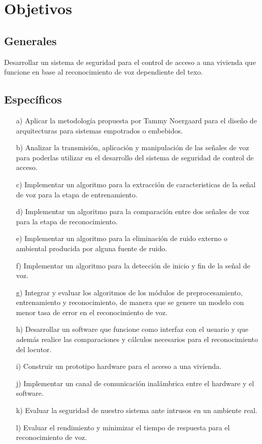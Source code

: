 \section{Objetivos}
\subsection{Generales}
Desarrollar un sistema de seguridad para el control de acceso a una vivienda que funcione en base al reconocimiento de voz dependiente del texo.
\subsection{Específicos}
\begin{enumerate}
\item[a)]Aplicar la metodología propuesta por Tammy Noergaard para el diseño de arquitecturas para sistemas empotrados o embebidos.
\item[b)]Analizar la transmisión, aplicación y manipulación de las señales de voz para poderlas utilizar en el desarrollo del sistema de seguridad de control de acceso.
\item[c)]Implementar un algoritmo para la extracción de caracteristicas de la señal de voz para la etapa de entrenamiento.
\item[d)]Implementar un algoritmo para la comparación entre dos señales de voz para la etapa de reconocimiento.
\item[e)]Implementar un algoritmo para la eliminación de ruido externo o ambiental producida por alguna fuente de ruido.
\item[f)]Implementar un algoritmo para la detección de inicio y fin de la señal de voz.
\item[g)]Integrar y evaluar los algoritmos de los módulos de preprocesamiento, entrenamiento y reconocimiento, de manera que se genere un modelo con menor tasa de error en el reconocimiento de voz.
\item[h)]Desarrollar un software que funcione como interfaz con el usuario y que además realice las comparaciones y cálculos necesarios para el reconocimiento del locutor.
\item[i)]Construir un prototipo hardware para el acceso a una vivienda.
\item[j)]Implementar un canal de comunicación inalámbrica entre el hardware y el software.
\item[k)]Evaluar la seguridad de nuestro sistema ante intrusos en un ambiente real.
\item[l)]Evaluar el rendimiento y minimizar el tiempo de respuesta para el reconocimiento de voz.
\end{enumerate}

